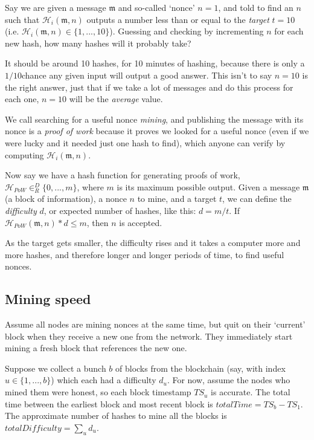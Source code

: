 Say we are given a message $\mathfrak{m}$ and so-called `nonce' $n = 1$, and told to find an $n$ such that $\mathcal{H}_i(\mathfrak{m},n)$ outputs a number less than or equal to the {\em target} $t = 10$ (i.e. $\mathcal{H}_i(\mathfrak{m},n) \in \{1,...,10\}$). Guessing and checking by incrementing $n$ for each new hash, how many hashes will it probably take?

It should be around 10 hashes, for 10 minutes of hashing, because there is only a $1/10$\nth chance any given input will output a good answer. This isn't to say $n = 10$ is the right answer, just that if we take a lot of messages and do this process for each one, $n = 10$ will be the {\em average} value.

We call searching for a useful nonce {\em mining}, and publishing the message with its nonce is a {\em proof of work} because it proves we looked for a useful nonce (even if we were lucky and it needed just one hash to find), which anyone can verify by computing $\mathcal{H}_i(\mathfrak{m},n)$.

Now say we have a hash function for generating proofs of work, $\mathcal{H}_{PoW} \in^D_R \{0,...,m\}$, where $m$ is its maximum possible output. Given a message $\mathfrak{m}$ (a block of information), a nonce $n$ to mine, and a target $t$, we can define the {\em difficulty} $d$, or expected number of hashes, like this: $d = m/t$. If $\mathcal{H}_{PoW}(\mathfrak{m},n)*d \leq m$, then $n$ is accepted.

As the target gets smaller, the difficulty rises and it takes a computer more and more hashes, and therefore longer and longer periods of time, to find useful nonces.


\subsection{Mining speed}

Assume all nodes are mining nonces at the same time, but quit on their `current' block when they receive a new one from the network. They immediately start mining a fresh block that references the new one.

Suppose we collect a bunch $b$ of blocks from the blockchain (say, with index $u \in \{1,...,b\}$) which each had a difficulty $d_u$. For now, assume the nodes who mined them were honest, so each block timestamp ${TS}_u$ is accurate. The total time between the earliest block and most recent block is $\mathit{totalTime} = {TS}_b - {TS}_1$. The approximate number of hashes to mine all the blocks is $\mathit{totalDifficulty} = \sum_u d_u$.

